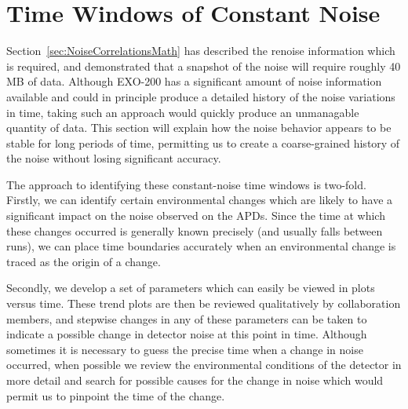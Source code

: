 \section{Time Windows of Constant Noise}\label{sec:NoiseCorrelationsTimeWindows}

Section~\ref{sec:NoiseCorrelationsMath} has described the renoise information which is required, and demonstrated that a snapshot of the noise will require roughly 40 MB of data.  Although EXO-200 has a significant amount of noise information available and could in principle produce a detailed history of the noise variations in time, taking such an approach would quickly produce an unmanagable quantity of data.  This section will explain how the noise behavior appears to be stable for long periods of time, permitting us to create a coarse-grained history of the noise without losing significant accuracy.

The approach to identifying these constant-noise time windows is two-fold.  Firstly, we can identify certain environmental changes which are likely to have a significant impact on the noise observed on the APDs.  Since the time at which these changes occurred is generally known precisely (and usually falls between runs), we can place time boundaries accurately when an environmental change is traced as the origin of a change.

Secondly, we develop a set of parameters which can easily be viewed in plots versus time.  These trend plots are then be reviewed qualitatively by collaboration members, and stepwise changes in any of these parameters can be taken to indicate a possible change in detector noise at this point in time.  Although sometimes it is necessary to guess the precise time when a change in noise occurred, when possible we review the environmental conditions of the detector in more detail and search for possible causes for the change in noise which would permit us to pinpoint the time of the change.

